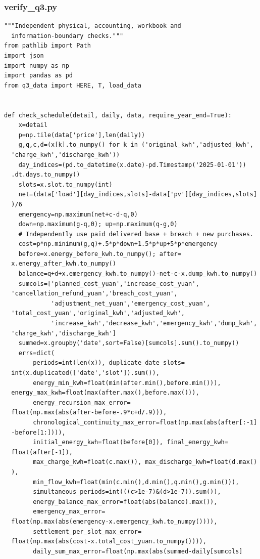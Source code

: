 \subsubsection*{verify\_q3.py}
\begin{verbatim}
"""Independent physical, accounting, workbook and
  information-boundary checks."""
from pathlib import Path
import json
import numpy as np
import pandas as pd
from q3_data import HERE, T, load_data


def check_schedule(detail, daily, data, require_year_end=True):
    x=detail
    p=np.tile(data['price'],len(daily))
    g,q,c,d=(x[k].to_numpy() for k in ('original_kwh','adjusted_kwh',
  'charge_kwh','discharge_kwh'))
    day_indices=(pd.to_datetime(x.date)-pd.Timestamp('2025-01-01'))
  .dt.days.to_numpy()
    slots=x.slot.to_numpy(int)
    net=(data['load'][day_indices,slots]-data['pv'][day_indices,slots]
  )/6
    emergency=np.maximum(net+c-d-q,0)
    down=np.maximum(g-q,0); up=np.maximum(q-g,0)
    # Independently use paid delivered base + breach + new purchases.
    cost=p*np.minimum(g,q)+.5*p*down+1.5*p*up+5*p*emergency
    before=x.energy_before_kwh.to_numpy(); after=
  x.energy_after_kwh.to_numpy()
    balance=q+d+x.emergency_kwh.to_numpy()-net-c-x.dump_kwh.to_numpy()
    sumcols=['planned_cost_yuan','increase_cost_yuan',
  'cancellation_refund_yuan','breach_cost_yuan',
             'adjustment_net_yuan','emergency_cost_yuan',
  'total_cost_yuan','original_kwh','adjusted_kwh',
             'increase_kwh','decrease_kwh','emergency_kwh','dump_kwh',
  'charge_kwh','discharge_kwh']
    summed=x.groupby('date',sort=False)[sumcols].sum().to_numpy()
    errs=dict(
        periods=int(len(x)), duplicate_date_slots=
  int(x.duplicated(['date','slot']).sum()),
        energy_min_kwh=float(min(after.min(),before.min())),
  energy_max_kwh=float(max(after.max(),before.max())),
        energy_recursion_max_error=
  float(np.max(abs(after-before-.9*c+d/.9))),
        chronological_continuity_max_error=float(np.max(abs(after[:-1]
  -before[1:]))),
        initial_energy_kwh=float(before[0]), final_energy_kwh=
  float(after[-1]),
        max_charge_kwh=float(c.max()), max_discharge_kwh=float(d.max()
  ),
        min_flow_kwh=float(min(c.min(),d.min(),q.min(),g.min())),
        simultaneous_periods=int(((c>1e-7)&(d>1e-7)).sum()),
        energy_balance_max_error=float(abs(balance).max()),
        emergency_max_error=
  float(np.max(abs(emergency-x.emergency_kwh.to_numpy()))),
        settlement_per_slot_max_error=
  float(np.max(abs(cost-x.total_cost_yuan.to_numpy()))),
        daily_sum_max_error=float(np.max(abs(summed-daily[sumcols]

\end{verbatim}
